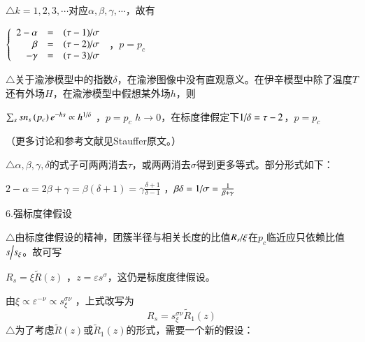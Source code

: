 \documentclass{article} %
\begin{document}
\noindent $\mathrm{\triangle}$$k=1,2,3,\cdots $对应$\alpha ,\beta ,\gamma ,\cdots $，故有

 $\left\{\begin{array}{rcl} {2-\alpha } & {=} & {{(\tau -1)\mathord{\left/ {\vphantom {(\tau -1) \sigma }} \right. \kern-\nulldelimiterspace} \sigma } } \\ {\beta } & {=} & {{(\tau -2)\mathord{\left/ {\vphantom {(\tau -2) \sigma }} \right. \kern-\nulldelimiterspace} \sigma } } \\ {-\gamma } & {=} & {{(\tau -3)\mathord{\left/ {\vphantom {(\tau -3) \sigma }} \right. \kern-\nulldelimiterspace} \sigma } } \end{array}\right. $  ，$p=p_{c} $ 

\noindent $\mathrm{\triangle}$关于渝渗模型中的指数$\delta $，在渝渗图像中没有直观意义。在伊辛模型中除了温度$T$还有外场$H$，在渝渗模型中假想某外场$h$，则

 $\sum _{s}sn_{s}  \left(p_{c} \right)e^{-hs} \propto h^{{1\mathord{\left/ {\vphantom {1 \delta }} \right. \kern-\nulldelimiterspace} \delta } } $ ，$p=p_{c} $ $h\to 0$，在标度律假定下${1\mathord{\left/ {\vphantom {1 \delta }} \right. \kern-\nulldelimiterspace} \delta } =\tau -2$，$p=p_{c} $

\noindent （更多讨论和参考文献见Stauffer原文。）

\noindent $\mathrm{\triangle}$$\alpha ,\beta ,\gamma ,\delta $的式子可两两消去$\tau $，或两两消去$\sigma $得到更多等式。部分形式如下：

 $2-\alpha =2\beta +\gamma =\beta (\delta +1)=\gamma \frac{\delta +1}{\delta -1} $ ，$\beta \delta ={1\mathord{\left/ {\vphantom {1 \sigma }} \right. \kern-\nulldelimiterspace} \sigma } =\frac{1}{\beta +\gamma } $ 

\noindent 6.强标度律假设

\noindent $\mathrm{\triangle}$由标度律假设的精神，团簇半径与相关长度的比值${R_{s} \mathord{\left/ {\vphantom {R_{s}  \xi }} \right. \kern-\nulldelimiterspace} \xi } $在$p_{c} $临近应只依赖比值${s\mathord{\left/ {\vphantom {s s_{\xi } }} \right. \kern-\nulldelimiterspace} s_{\xi } } $。故可写

 $R_{s} =\xi \widetilde{R}\left(z\right)$ ，$z=\varepsilon s^{\sigma } $，这仍是标度度律假设。

\noindent 由$\xi \propto \varepsilon ^{-\nu } \propto s_{\xi }^{\sigma \nu } $ ，上式改写为
\[R_{s} =s_{\xi }^{\sigma \nu } \widetilde{R}_{1} \left(z\right)\] 
$\mathrm{\triangle}$为了考虑$\widetilde{R}\left(z\right)$或$\widetilde{R}_{1} \left(z\right)$的形式，需要一个新的假设：
\end{document}
